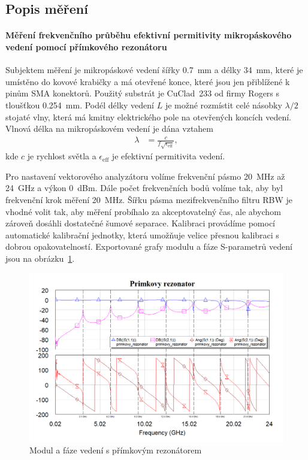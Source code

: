 \documentclass[11pt,a4paper]{article}
\begin{document}
\subsection*{Popis měření}

\paragraph*{Měření frekvenčního průběhu efektivní permitivity mikropáskového vedení pomocí přímkového rezonátoru} Subjektem měření je mikropáskové vedení šířky 0.7~mm a délky 34~mm, které je umístěno do kovové krabičky a má otevřené konce, které jsou jen přiblížené k pinům SMA konektorů. Použitý substrát je CuClad\textregistered\ 233 od firmy Rogers s tloušťkou 0.254~mm. Podél délky vedení $L$ je možné rozmístit celé násobky $\lambda/2$ stojaté vlny, která má kmitny elektrického pole na otevřených koncích vedení. Vlnová délka na mikropáskovém vedení je dána vztahem
\begin{align}
    \lambda &= \frac{c}{f\sqrt{\epsilon_{\mathrm{eff}}}},
\end{align}
kde $c$ je rychlost světla a $\epsilon_{\mathrm{eff}}$ je efektivní permitivita vedení.

Pro nastavení vektorového analyzátoru volíme frekvenční pásmo 20~MHz až 24~GHz a výkon 0~dBm. Dále počet frekvenčních bodů volíme tak, aby byl frekvenční krok měření 20~MHz. Šířku pásma mezifrekvenčního filtru RBW je vhodné volit tak, aby měření probíhalo za akceptovatelný čas, ale abychom zároveň dosáhli dostatečné šumové separace. Kalibraci provádíme pomocí automatické kalibrační jednotky, která umožňuje velice přesnou kalibraci s dobrou opakovatelností. Exportované grafy modulu a fáze S-parametrů vedení jsou na obrázku~\ref{fig:primkovy-rezonator}.
\begin{figure}[!ht]
\centering
\includegraphics[width=.9\textwidth]{src/primkovy-rezonator.png}
\caption{Modul a fáze vedení s přímkovým rezonátorem}
\label{fig:primkovy-rezonator}
\end{figure}
\end{document}
